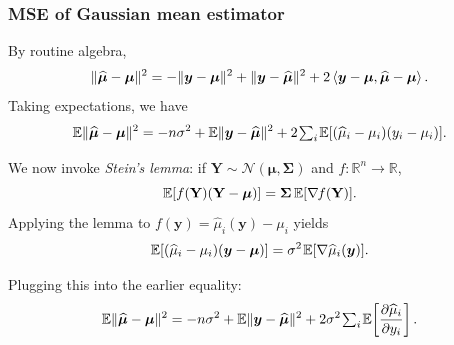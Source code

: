 \documentclass[18pt]{beamer}
\newcommand{\defineTightSpacing}{%
	\setlength{\abovedisplayskip}{.25\baselineskip}%
	\setlength{\belowdisplayskip}{.25\baselineskip}%
}
\newcommand{\thinnerspace}{\mskip.5\thinmuskip}
\newcommand{\negthinnerspace}{\mskip-.5\thinmuskip}
\newcommand{\expectation}{\mathbb{E}}
\DeclareMathOperator*{\covariance}{Cov}
\newcommand{\normalDist}{\mathcal{N}}
\newcommand{\by}{\bm{y}}
\newcommand{\bmu}{\bm{\mu}}
\newcommand{\bSigma}{\bm{\Sigma}}
\begin{document}
\begin{frame}
\frametitle{M{\normalsize SE} of Gaussian mean estimator}
\pause%
By routine algebra,
\begin{equation*} \defineTightSpacing%
\| \widehat{\bmu} - \bmu \|^2
	= - \| \by - \bmu \|^2 + \| \by - \widehat{\bmu} \|^2 
		+ 2 \left\langle \by - \bmu, \widehat{\bmu} - \bmu \right\rangle.
\end{equation*}
\pause%
Taking expectations, we have
\begin{equation*} \defineTightSpacing%
\expectation \| \widehat{\bmu} - \bmu \|^2
	= - n \sigma^2 + \expectation \| \by - \widehat{\bmu} \|^2 
		+ 2 \thinnerspace {\textstyle \sum_i} \thinnerspace \expectation[ (\widehat{\mu}_i - \mu_i) (y_i - \mu_i) ].
\end{equation*}

\pause%
We now invoke \textit{Stein's lemma}: if $\mathbf{Y} \sim \normalDist(\bmu, \bSigma)$ and $f: \mathbb{R}^n \to \mathbb{R}$, 
\begin{equation*} \defineTightSpacing%
\expectation[ f(\mathbf{Y}) (\mathbf{Y} - \bmu) ] = \bSigma \, \expectation[ \nabla \negthinnerspace f(\mathbf{Y})].
\end{equation*}
\pause%
Applying the lemma to $f(\by) = \widehat{\mu}_i(\by) - \mu_i$ yields
\begin{equation*} \defineTightSpacing%
\expectation[ (\widehat{\mu}_i - \mu_i) (\by - \bmu) ] 
	= \sigma^2 \thinnerspace \expectation[ \nabla \widehat{\mu}_i(\by)].
\end{equation*}

\pause%
Plugging this into the earlier equality:
\begin{equation*} \defineTightSpacing%
\expectation \| \widehat{\bmu} - \bmu \|^2
	= - n \sigma^2 + \expectation \| \by - \widehat{\bmu} \|^2 
		+ 2 \sigma^2 \thinnerspace {\textstyle \sum_i} \thinnerspace \expectation\!\left[ \frac{\partial \widehat{\mu}_i}{\partial y_i}  \right].
\end{equation*}
\end{frame}
\end{document}
